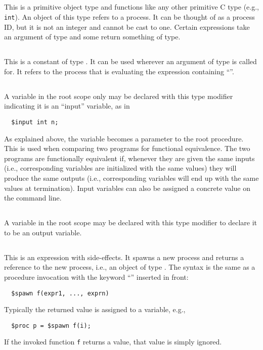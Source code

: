 \documentclass[11pt]{book}
\begin{document}
\subsection{\cproc} This is a primitive object type and functions like
any other primitive C type (e.g., \texttt{int}).  An object of this
type refers to a process.  It can be thought of as a process ID, but
it is not an integer and cannot be cast to one.  Certain expressions
take an argument of \cproc{} type and some return something of
\cproc{} type.

\subsection{\cself} This is a constant of type \cproc.  It can be used
wherever an argument of type \cproc{} is called for.  It refers to the
process that is evaluating the expression containing ``\cself''.

\subsection{\cinput} A variable in the root scope only may be declared
with this type modifier indicating it is an ``input'' variable, as in
\begin{verbatim}
  $input int n;
\end{verbatim}
As explained above, the variable becomes a parameter to the root
procedure.  This is used when comparing two programs for functional
equivalence.  The two programs are functionally equivalent if,
whenever they are given the same inputs (i.e., corresponding \cinput{}
variables are initialized with the same values) they will produce the
same outputs (i.e., corresponding \coutput{} variables will end up
with the same values at termination).  Input variables can also be
assigned a concrete value on the command line.

\subsection{\coutput} A variable in the root scope may be declared
with this type modifier to declare it to be an output variable.

\subsection{\cspawn} This is an expression with side-effects.  It
spawns a new process and returns a reference to the new process, i.e.,
an object of type \cproc.  The syntax is the same as a procedure
invocation with the keyword ``\cspawn'' inserted in front:
\begin{verbatim}
  $spawn f(expr1, ..., exprn)
\end{verbatim}
Typically the returned value is assigned to a variable, e.g.,
\begin{verbatim}
  $proc p = $spawn f(i);
\end{verbatim}
If the invoked function \texttt{f} returns a value, that value is
simply ignored.
\end{document}
